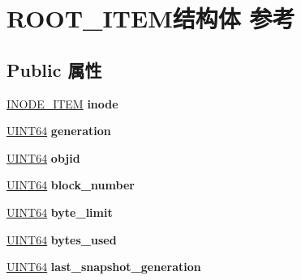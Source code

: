 \hypertarget{struct_r_o_o_t___i_t_e_m}{}\section{R\+O\+O\+T\+\_\+\+I\+T\+E\+M结构体 参考}
\label{struct_r_o_o_t___i_t_e_m}
\subsection*{Public 属性}
\begin{DoxyCompactItemize}
\item 
\mbox{\label{struct_r_o_o_t___i_t_e_m_ae1bbe0103d8b61e22a522a20f753d60d}} 
\hyperlink{struct_i_n_o_d_e___i_t_e_m}{I\+N\+O\+D\+E\+\_\+\+I\+T\+EM} {\bfseries inode}
\item 
\mbox{\label{struct_r_o_o_t___i_t_e_m_a072b474c60065eaaffcfadadf1fb4d87}} 
\hyperlink{_processor_bind_8h_a57be03562867144161c1bfee95ca8f7c}{U\+I\+N\+T64} {\bfseries generation}
\item 
\mbox{\label{struct_r_o_o_t___i_t_e_m_ac32cd61fcd68c4fa9068d4f1f6407c76}} 
\hyperlink{_processor_bind_8h_a57be03562867144161c1bfee95ca8f7c}{U\+I\+N\+T64} {\bfseries objid}
\item 
\mbox{\label{struct_r_o_o_t___i_t_e_m_af7a9a0e3efc3b76786079393ea6025f1}} 
\hyperlink{_processor_bind_8h_a57be03562867144161c1bfee95ca8f7c}{U\+I\+N\+T64} {\bfseries block\+\_\+number}
\item 
\mbox{\label{struct_r_o_o_t___i_t_e_m_a014c8bf4cdfd634386f46238c2d32fc2}} 
\hyperlink{_processor_bind_8h_a57be03562867144161c1bfee95ca8f7c}{U\+I\+N\+T64} {\bfseries byte\+\_\+limit}
\item 
\mbox{\label{struct_r_o_o_t___i_t_e_m_a3063cb760088751ec1e87077dfdebe17}} 
\hyperlink{_processor_bind_8h_a57be03562867144161c1bfee95ca8f7c}{U\+I\+N\+T64} {\bfseries bytes\+\_\+used}
\item 
\mbox{\label{struct_r_o_o_t___i_t_e_m_a1a42bbaa36f023209fdd4f261cc4b4fc}} 
\hyperlink{_processor_bind_8h_a57be03562867144161c1bfee95ca8f7c}{U\+I\+N\+T64} {\bfseries last\+\_\+snapshot\+\_\+generation}

\end{DoxyCompactItemize}
